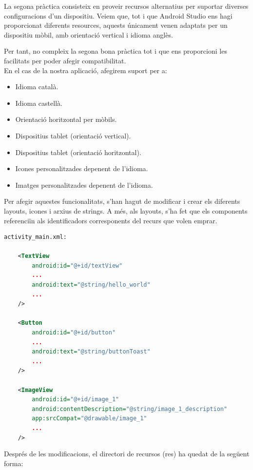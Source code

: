 \documentclass[12pt, letterpaper]{article}
\begin{document}
La segona pràctica consisteix en proveir recursos alternatius per suportar diverses configuracions d'un dispositiu. Veiem que, tot i que Android Studio ens hagi proporcionat diferents resources, aquests únicament venen adaptats
per un dispositiu mòbil, amb orientació vertical i idioma anglès. 

Per tant, no compleix la segona bona pràctica tot i que ens proporcioni les facilitats per poder afegir compatibilitat.\\

En el cas de la nostra aplicació, afegirem suport per a:
\begin{itemize}
    \item Idioma català.
    \item Idioma castellà.
    \item Orientació horitzontal per mòbils.
    \item Dispositius tablet (orientació vertical).
    \item Dispositius tablet (orientació horitzontal).
    \item Icones personalitzades depenent de l'idioma.
    \item Imatges personalitzades depenent de l'idioma.
\end{itemize}

Per afegir aquestes funcionalitats, s'han hagut de modificar i crear els diferents layouts, icones i arxius de strings. A més, als layouts, s'ha fet que els components referenciïn als identificadors corresponents del recurs que volen emprar.

\begin{lstlisting}[language=XML]
    activity_main.xml:

    <TextView
        android:id="@+id/textView"
        ...
        android:text="@string/hello_world"
        ...
    />

    <Button
        android:id="@+id/button"
        ...
        android:text="@string/buttonToast"
        ...
    />

    <ImageView
        android:id="@+id/image_1"
        android:contentDescription="@string/image_1_description"
        app:srcCompat="@drawable/image_1" 
        ...
    />

\end{lstlisting}

Després de les modificacions, el directori de recursos (res) ha quedat de la següent forma:
\end{document}
